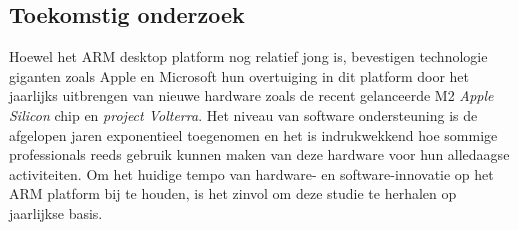 \documentclass[a0,portrait]{a0poster}
\begin{document}
\begin{multicols}{2}
\section*{Toekomstig onderzoek}
\color{black}
Hoewel het ARM desktop platform nog relatief jong is, bevestigen technologie giganten zoals Apple en Microsoft hun overtuiging in dit platform door het jaarlijks uitbrengen van nieuwe hardware zoals de recent gelanceerde M2 \textit{Apple Silicon} chip en \textit{project Volterra}.  Het niveau van software ondersteuning is de afgelopen jaren exponentieel toegenomen en het is indrukwekkend hoe sommige professionals reeds gebruik kunnen maken van deze hardware voor hun alledaagse activiteiten. Om het huidige tempo van hardware- en software-innovatie op het ARM platform bij te houden, is het zinvol om deze studie te herhalen op jaarlijkse basis.



\end{multicols}
\end{document}
